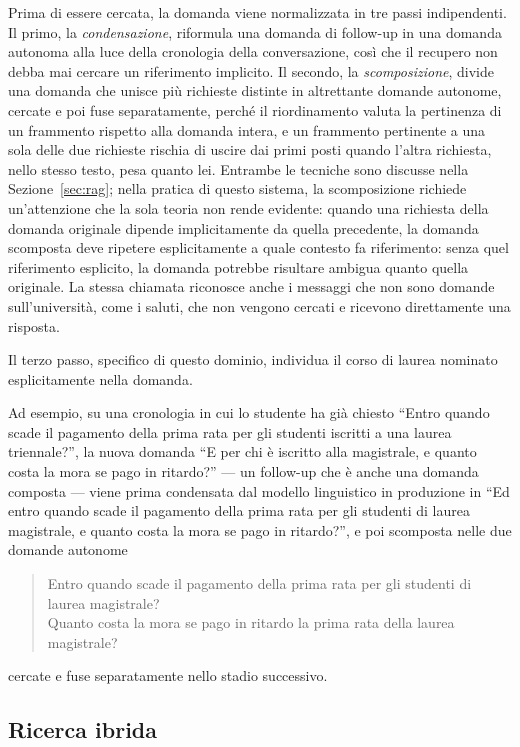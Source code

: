 Prima di essere cercata, la domanda viene normalizzata in tre passi indipendenti. Il primo, la
\emph{condensazione}, riformula una domanda di follow-up in una domanda autonoma alla luce della cronologia della
conversazione, così che il recupero non debba mai cercare un
riferimento implicito. Il secondo, la \emph{scomposizione}, divide una domanda che unisce più richieste distinte in
altrettante domande autonome, cercate e poi fuse separatamente, perché il riordinamento valuta la pertinenza di un
frammento rispetto alla domanda intera, e un frammento pertinente a una sola delle due richieste rischia di uscire
dai primi posti quando l'altra richiesta, nello stesso testo, pesa quanto lei. Entrambe le tecniche sono discusse
nella Sezione~\ref{sec:rag}; nella pratica di questo sistema, la scomposizione richiede un'attenzione che la sola
teoria non rende evidente: quando una richiesta della domanda originale dipende implicitamente da quella
precedente, la domanda scomposta
deve ripetere esplicitamente a quale contesto fa riferimento: senza quel riferimento esplicito, la domanda potrebbe risultare
ambigua quanto quella originale. La stessa chiamata riconosce anche i messaggi che non sono domande
sull'università, come i saluti, che non vengono cercati e ricevono direttamente una risposta.

Il terzo passo, specifico di questo dominio, individua il corso di laurea nominato esplicitamente nella domanda.

Ad esempio, su una cronologia in cui lo studente ha già chiesto ``Entro quando scade il pagamento della
prima rata per gli studenti iscritti a una laurea triennale?'', la nuova domanda ``E per chi è iscritto alla magistrale, e quanto costa la mora se pago in ritardo?'' --- un follow-up che è anche una domanda composta --- viene
prima condensata dal modello linguistico in produzione in ``Ed entro quando scade il
pagamento della prima rata per gli studenti di laurea magistrale, e quanto costa la mora se pago
in ritardo?'', e poi scomposta nelle due domande autonome
\begin{quote}
  \small
  Entro quando scade il pagamento della prima rata per gli studenti di laurea magistrale?\\
  Quanto costa la mora se pago in ritardo la prima rata della laurea magistrale?
\end{quote}
cercate e fuse separatamente nello stadio successivo.

\subsection{Ricerca ibrida}\label{sec:ricerca-ibrida}

